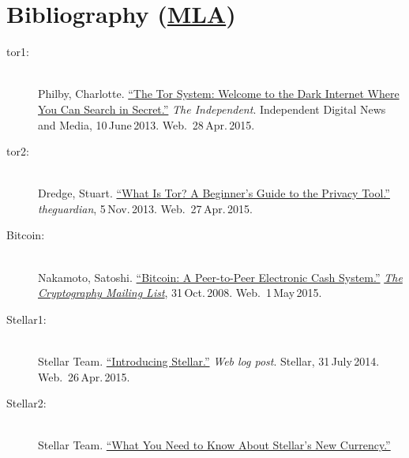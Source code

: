 \documentclass[english, DIV=calc, BCOR=5mm, fontsize=11pt, portrait]{scrartcl}	 %
\begin{document}
\newpage

\section{Bibliography (\href{http://www2.liu.edu/cwis/cwp/library/workshop/citmla.htm}{MLA})}


\begin{description}
	\item[tor1:] \hfill \\
		Philby, Charlotte.
		\href{http://www.independent.co.uk/news/media/online/the-tor-system-welcome-to-the-dark-internet-where-you-can-search-in-secret-8651364.html}{\enquote{The Tor 	System: Welcome to the Dark Internet Where You Can Search in Secret.}}
		\emph{The Independent}.
		Independent Digital News and Media, 10\,June\,2013.
		Web.~28\,Apr.\,2015.
	\item[tor2:] \hfill \\
		Dredge, Stuart.
		\href{http://www.theguardian.com/technology/2013/nov/05/tor-beginners-guide-nsa-browser}{\enquote{What Is Tor? A Beginner's Guide to the Privacy Tool.}}
		\emph{theguardian}, 5\,Nov.\,2013.
		Web.~27\,Apr.\,2015.
	\item[Bitcoin:]\hfill \\
		Nakamoto, Satoshi.
		\href{http://bitcoin.org/bitcoin.pdf}{\enquote{Bitcoin: A Peer-to-Peer Electronic Cash System.}}
		\href{http://www.metzdowd.com/mailman/listinfo/cryptography}{\emph{The Cryptography Mailing List}}, 31\,Oct.\,2008.
		Web.~1\,May\,2015.
	\item[Stellar1:] \hfill \\
		Stellar Team.
		\href{https://www.stellar.org/blog/introducing-stellar}{\enquote{Introducing Stellar.}} 
		\emph{Web log post}.
		Stellar, 31\,July\,2014.
		Web.~26\,Apr.\,2015.
	\item[Stellar2:] \hfill \\
		Stellar Team.
		\href{http://thenextweb.com/insider/2014/08/01/stellar-open-source-solution-international-money-transfers-currency}{\enquote{What You Need to Know About 	Stellar's New Currency.}}

\end{description}
\end{document}
